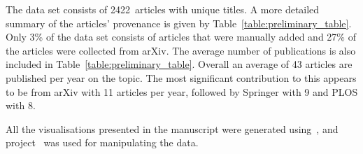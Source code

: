 \documentclass{article}
\theoremstyle{definition}
\newcommand{\totalarticles}{2422}
\begin{document}
The data set consists of \totalarticles~articles with unique
titles. A more detailed summary of the articles' provenance
is given by Table~\ref{table:preliminary_table}. Only 3\% of the data set consists of
articles that were manually added and 27\% of the articles were collected from
arXiv. The average number of publications is also included in
Table~\ref{table:preliminary_table}. Overall an average of 43 articles are published
per year on the topic. The most significant contribution to this appears to be
from arXiv with 11 articles per year, followed by Springer with 9 and PLOS with
8.

\begin{table}[!hbtp]
    \begin{center}
    \end{center}
    \caption{Summary of~\citep{pd_data_2018} per provenance.}
    \label{table:preliminary_table}
\end{table}

All the visualisations presented in the manuscript were generated
using~\citep{hunter2007matplotlib}, and project~\citep{walt2011numpy} was used for
manipulating the data.
\end{document}
